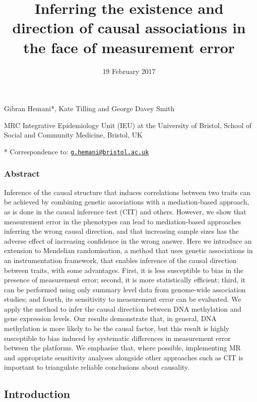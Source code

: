 \documentclass[]{article}
\title{Inferring the existence and direction of causal associations in the face
of measurement error}
\author{}
\date{19 February 2017}
\begin{document}
\maketitle

Gibran Hemani*, Kate Tilling and George Davey Smith

MRC Integrative Epidemiology Unit (IEU) at the University of Bristol,
School of Social and Community Medicine, Bristol, UK

* Correspondence to:
\href{mailto:g.hemani@bristol.ac.uk}{\nolinkurl{g.hemani@bristol.ac.uk}}

\subsubsection{Abstract}\label{abstract}

Inference of the causal structure that induces correlations between two
traits can be achieved by combining genetic associations with a
mediation-based approach, as is done in the causal inference test (CIT)
and others. However, we show that measurement error in the phenotypes
can lead to mediation-based approaches inferring the wrong causal
direction, and that increasing sample sizes has the adverse effect of
increasing confidence in the wrong answer. Here we introduce an
extension to Mendelian randomisation, a method that uses genetic
associations in an instrumentation framework, that enables inference of
the causal direction between traits, with some advantages. First, it is
less susceptible to bias in the presence of measurement error; second,
it is more statistically efficient; third, it can be performed using
only summary level data from genome-wide association studies; and
fourth, its sensitivity to measurement error can be evaluated. We apply
the method to infer the causal direction between DNA methylation and
gene expression levels. Our results demonstrate that, in general, DNA
methylation is more likely to be the causal factor, but this result is
highly susceptible to bias induced by systematic differences in
measurement error between the platforms. We emphasise that, where
possible, implementing MR and appropriate sensitivity analyses alongside
other approaches such as CIT is important to triangulate reliable
conclusions about causality.

\subsection{Introduction}\label{introduction}
\end{document}
